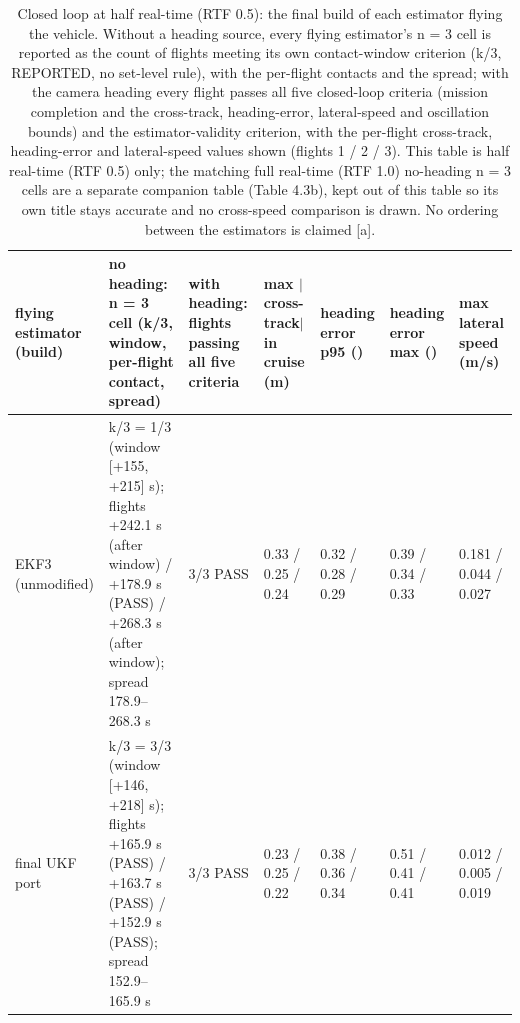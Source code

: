 \begin{table}[htbp]
\centering
\footnotesize
\caption{Closed loop at half real-time (RTF 0.5): the final build of each estimator flying the vehicle. Without a heading source, every flying estimator's n = 3 cell is reported as the count of flights meeting its own contact-window criterion (k/3, REPORTED, no set-level rule), with the per-flight contacts and the spread; with the camera heading every flight passes all five closed-loop criteria (mission completion and the cross-track, heading-error, lateral-speed and oscillation bounds) and the estimator-validity criterion, with the per-flight cross-track, heading-error and lateral-speed values shown (flights 1 / 2 / 3). This table is half real-time (RTF 0.5) only; the matching full real-time (RTF 1.0) no-heading n = 3 cells are a separate companion table (Table 4.3b), kept out of this table so its own title stays accurate and no cross-speed comparison is drawn. No ordering between the estimators is claimed [a].}
\label{tab:T4}
\begin{tabular}{p{}p{}p{}p{}p{}p{}p{}}
\toprule
\textbf{flying estimator (build)} & \textbf{no heading: n = 3 cell (k/3, window, per-flight contact, spread)} & \textbf{with heading: flights passing all five criteria} & \textbf{max $|$cross-track$|$ in cruise (m)} & \textbf{heading error p95 (\textdegree{})} & \textbf{heading error max (\textdegree{})} & \textbf{max lateral speed (m/s)} \\
\midrule
EKF3 (unmodified) & k/3 = 1/3 (window [+155, +215] s); flights +242.1 s (after window) / +178.9 s (PASS) / +268.3 s (after window); spread 178.9--268.3 s & 3/3 PASS & 0.33 / 0.25 / 0.24 & 0.32 / 0.28 / 0.29 & 0.39 / 0.34 / 0.33 & 0.181 / 0.044 / 0.027 \\
final UKF port & k/3 = 3/3 (window [+146, +218] s); flights +165.9 s (PASS) / +163.7 s (PASS) / +152.9 s (PASS); spread 152.9--165.9 s & 3/3 PASS & 0.23 / 0.25 / 0.22 & 0.38 / 0.36 / 0.34 & 0.51 / 0.41 / 0.41 & 0.012 / 0.005 / 0.019 \\

\end{tabular}
\end{table}

